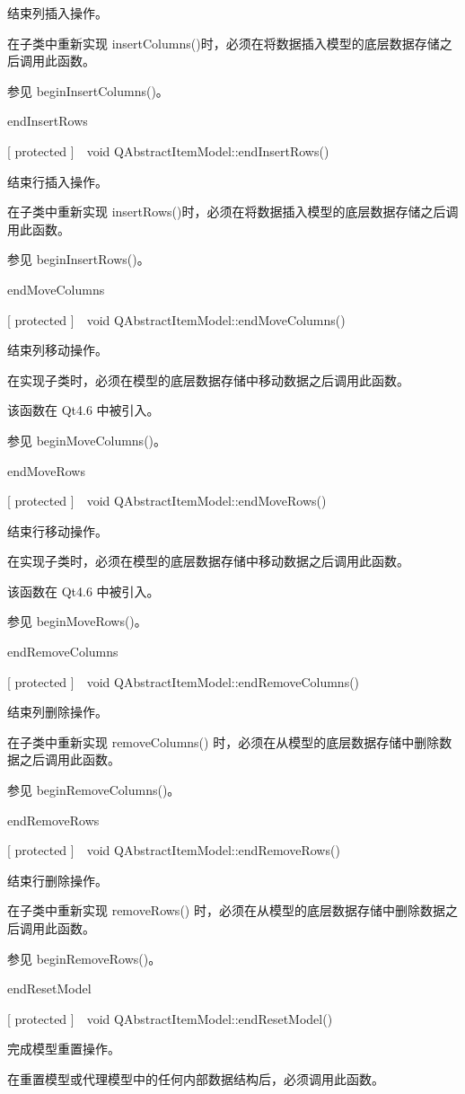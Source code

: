 结束列插入操作。

在子类中重新实现 insertColumns()时，必须在将数据插入模型的底层数据存储之后调用此函数。

参见 beginInsertColumns()。

endInsertRows

[ protected ] void QAbstractItemModel::endInsertRows()

结束行插入操作。

在子类中重新实现 insertRows()时，必须在将数据插入模型的底层数据存储之后调用此函数。

参见 beginInsertRows()。

endMoveColumns

[ protected ] void QAbstractItemModel::endMoveColumns()

结束列移动操作。

在实现子类时，必须在模型的底层数据存储中移动数据之后调用此函数。

该函数在 Qt4.6 中被引入。

参见 beginMoveColumns()。

endMoveRows

[ protected ] void QAbstractItemModel::endMoveRows()

结束行移动操作。

在实现子类时，必须在模型的底层数据存储中移动数据之后调用此函数。

该函数在 Qt4.6 中被引入。

参见 beginMoveRows()。

endRemoveColumns

[ protected ] void QAbstractItemModel::endRemoveColumns()

结束列删除操作。

在子类中重新实现 removeColumns() 时，必须在从模型的底层数据存储中删除数据之后调用此函数。

参见 beginRemoveColumns()。

endRemoveRows

[ protected ] void QAbstractItemModel::endRemoveRows()

结束行删除操作。

在子类中重新实现 removeRows() 时，必须在从模型的底层数据存储中删除数据之后调用此函数。

参见 beginRemoveRows()。

endResetModel

[ protected ] void QAbstractItemModel::endResetModel()

完成模型重置操作。

在重置模型或代理模型中的任何内部数据结构后，必须调用此函数。

